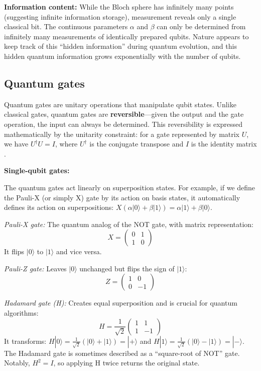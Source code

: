 \documentclass[a4paper,12pt]{amsart}
\begin{document}
\textbf{Information content:} While the Bloch sphere has infinitely many points (suggesting infinite information storage), measurement reveals only a single classical bit. The continuous parameters $\alpha$ and $\beta$ can only be determined from infinitely many measurements of identically prepared qubits. Nature appears to keep track of this ``hidden information'' during quantum evolution, and this hidden quantum information grows exponentially with the number of qubits.

\subsection{Quantum gates}
Quantum gates are unitary operations that manipulate qubit states. Unlike classical gates, quantum gates are \textbf{reversible}—given the output and the gate operation, the input can always be determined. This reversibility is expressed mathematically by the unitarity constraint: for a gate represented by matrix $U$, we have $U^\dagger U = I$, where $U^\dagger$ is the conjugate transpose and $I$ is the identity matrix \cite{nielsen2011quantum, scherer2019mathematics}.

\textbf{Single-qubit gates:}

The quantum gates act linearly on superposition states. For example, if we define the Pauli-X (or simply X) gate by its action on basis states, it automatically defines its action on superpositions: $X(\alpha|0\rangle + \beta|1\rangle) = \alpha|1\rangle + \beta|0\rangle$.

\textit{Pauli-X gate:} The quantum analog of the NOT gate, with matrix representation:
\begin{equation}
X = \begin{pmatrix} 0 & 1 \\ 1 & 0 \end{pmatrix}
\end{equation}
It flips $|0\rangle$ to $|1\rangle$ and vice versa.

\textit{Pauli-Z gate:} Leaves $|0\rangle$ unchanged but flips the sign of $|1\rangle$:
\begin{equation}
Z = \begin{pmatrix} 1 & 0 \\ 0 & -1 \end{pmatrix}
\end{equation}

\textit{Hadamard gate (H):} Creates equal superposition and is crucial for quantum algorithms:
\begin{equation}
H = \frac{1}{\sqrt{2}}\begin{pmatrix} 1 & 1 \\ 1 & -1 \end{pmatrix}
\end{equation}
It transforms: $H|0\rangle = \frac{1}{\sqrt{2}}(|0\rangle + |1\rangle) = |+\rangle$ and $H|1\rangle = \frac{1}{\sqrt{2}}(|0\rangle - |1\rangle) = |-\rangle$. The Hadamard gate is sometimes described as a ``square-root of NOT'' gate. Notably, $H^2 = I$, so applying H twice returns the original state.
\end{document}
